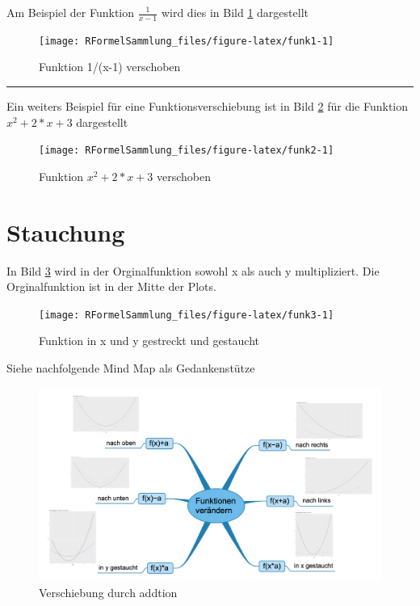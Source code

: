 \documentclass[]{book}
\begin{document}
Am Beispiel der Funktion \(\frac{1}{x-1}\) wird dies in Bild
\ref{fig:funk1} dargestellt

\begin{figure}
\texttt{[image: RFormelSammlung\_files/figure-latex/funk1-1]} \caption{Funktion 1/(x-1) verschoben}\label{fig:funk1}
\end{figure}

\begin{center}\rule{0.5\linewidth}{\linethickness}\end{center}

Ein weiters Beispiel für eine Funktionsverschiebung ist in Bild
\ref{fig:funk2} für die Funktion \(x^2+2*x+3\) dargestellt

\begin{figure}
\texttt{[image: RFormelSammlung\_files/figure-latex/funk2-1]} \caption{Funktion $x^2+2*x+3$ verschoben}\label{fig:funk2}
\end{figure}

\section{Stauchung}\label{stauchung}

In Bild \ref{fig:funk3} wird in der Orginalfunktion sowohl x als auch y
multipliziert. Die Orginalfunktion ist in der Mitte der Plots.

\begin{figure}
\texttt{[image: RFormelSammlung\_files/figure-latex/funk3-1]} \caption{Funktion in x und y gestreckt und gestaucht}\label{fig:funk3}
\end{figure}

Siehe nachfolgende Mind Map als Gedankenstütze

\begin{figure}

{\centering \includegraphics[width=25in]{image/FunktionsVerschiebung} 

}

\caption{Verschiebung durch addtion}\label{fig:mindMapVerschiebung}
\end{figure}


\end{document}
